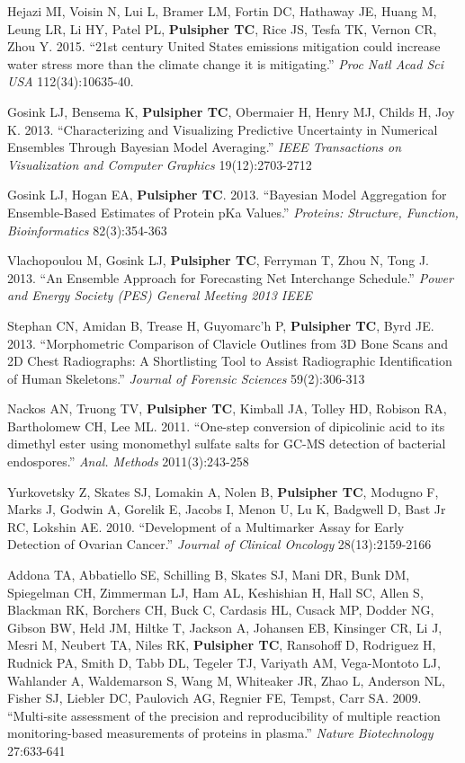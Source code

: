 \documentclass[11pt,]{article}
\begin{document}
Hejazi MI, Voisin N, Lui L, Bramer LM, Fortin DC, Hathaway JE, Huang M,
Leung LR, Li HY, Patel PL, \textbf{Pulsipher TC}, Rice JS, Tesfa TK,
Vernon CR, Zhou Y. 2015. ``21st century United States emissions
mitigation could increase water stress more than the climate change it
is mitigating.'' \emph{Proc Natl Acad Sci USA} 112(34):10635-40.

Gosink LJ, Bensema K, \textbf{Pulsipher TC}, Obermaier H, Henry MJ,
Childs H, Joy K. 2013. ``Characterizing and Visualizing Predictive
Uncertainty in Numerical Ensembles Through Bayesian Model Averaging.''
\emph{IEEE Transactions on Visualization and Computer Graphics}
19(12):2703-2712

Gosink LJ, Hogan EA, \textbf{Pulsipher TC}. 2013. ``Bayesian Model
Aggregation for Ensemble-Based Estimates of Protein pKa Values.''
\emph{Proteins: Structure, Function, Bioinformatics} 82(3):354-363

Vlachopoulou M, Gosink LJ, \textbf{Pulsipher TC}, Ferryman T, Zhou N,
Tong J. 2013. ``An Ensemble Approach for Forecasting Net Interchange
Schedule.'' \emph{Power and Energy Society (PES) General Meeting 2013
IEEE}

Stephan CN, Amidan B, Trease H, Guyomarc'h P, \textbf{Pulsipher TC},
Byrd JE. 2013. ``Morphometric Comparison of Clavicle Outlines from 3D
Bone Scans and 2D Chest Radiographs: A Shortlisting Tool to Assist
Radiographic Identification of Human Skeletons.'' \emph{Journal of
Forensic Sciences} 59(2):306-313

Nackos AN, Truong TV, \textbf{Pulsipher TC}, Kimball JA, Tolley HD,
Robison RA, Bartholomew CH, Lee ML. 2011. ``One-step conversion of
dipicolinic acid to its dimethyl ester using monomethyl sulfate salts
for GC-MS detection of bacterial endospores.'' \emph{Anal. Methods}
2011(3):243-258

Yurkovetsky Z, Skates SJ, Lomakin A, Nolen B, \textbf{Pulsipher TC},
Modugno F, Marks J, Godwin A, Gorelik E, Jacobs I, Menon U, Lu K,
Badgwell D, Bast Jr RC, Lokshin AE. 2010. ``Development of a Multimarker
Assay for Early Detection of Ovarian Cancer.'' \emph{Journal of Clinical
Oncology} 28(13):2159-2166

Addona TA, Abbatiello SE, Schilling B, Skates SJ, Mani DR, Bunk DM,
Spiegelman CH, Zimmerman LJ, Ham AL, Keshishian H, Hall SC, Allen S,
Blackman RK, Borchers CH, Buck C, Cardasis HL, Cusack MP, Dodder NG,
Gibson BW, Held JM, Hiltke T, Jackson A, Johansen EB, Kinsinger CR, Li
J, Mesri M, Neubert TA, Niles RK, \textbf{Pulsipher TC}, Ransohoff D,
Rodriguez H, Rudnick PA, Smith D, Tabb DL, Tegeler TJ, Variyath AM,
Vega-Montoto LJ, Wahlander A, Waldemarson S, Wang M, Whiteaker JR, Zhao
L, Anderson NL, Fisher SJ, Liebler DC, Paulovich AG, Regnier FE, Tempst,
Carr SA. 2009. ``Multi-site assessment of the precision and
reproducibility of multiple reaction monitoring-based measurements of
proteins in plasma.'' \emph{Nature Biotechnology} 27:633-641
\end{document}
